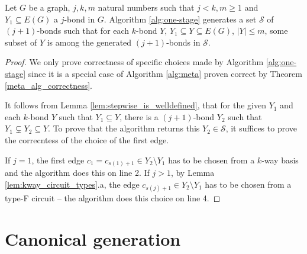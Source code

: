 \clearpage

\begin{thm}
	Let $G$ be a graph, $j,k,m$ natural numbers such that $j < k, m \geq 1$ and $Y_1 \subseteq E(G)$ a $j$-bond in $G$. Algorithm \ref{alg:one-stage} generates a set $\mathcal{S}$ of $(j+1)$-bonds such that for each $k$-bond $Y$, $Y_1 \subseteq Y \subseteq E(G)$, $\lvert Y \rvert \leq m$, some subset of $Y$ is among the generated $(j+1)$-bonds in $\mathcal{S}$.
\end{thm}

\begin{proof}
	We only prove correctness of specific choices made by Algorithm \ref{alg:one-stage} since it is a special case of Algorithm \ref{alg:meta} proven correct by Theorem \ref{meta_alg_correctness}.

	It follows from Lemma \ref{lem:stepwise_is_welldefined}, that for the given $Y_1$ and each $k$-bond $Y$ such that $Y_1 \subseteq Y$, there is a $(j+1)$-bond $Y_2$ such that $Y_1 \subsetneq Y_2 \subseteq Y$. %
	To prove that the algorithm returns this $Y_2 \in \mathcal{S}$, it suffices to prove the correcntess of the choice of the first edge.

	If $j = 1$, the first edge $c_1 = c_{s(1)+1} \in Y_2 \setminus Y_1$ has to be chosen from a $k$-way basis and the algorithm does this on line 2. If $j > 1$, by Lemma \ref{lem:kway_circuit_types}.a, the edge $c_{s(j)+1} \in Y_2 \setminus Y_1$ has to be chosen from a type-F circuit -- the algorithm does this choice on line 4.



\end{proof}


\chapter{Canonical generation}
\label{ch:canonical}


